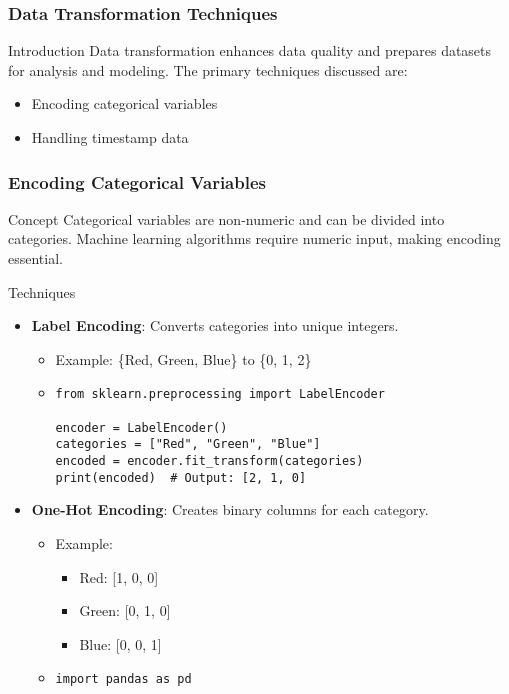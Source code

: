 \documentclass[aspectratio=169]{beamer}
\begin{document}
\begin{frame}
    \frametitle{Data Transformation Techniques}
    \begin{block}{Introduction}
        Data transformation enhances data quality and prepares datasets for analysis and modeling.
        The primary techniques discussed are:
        \begin{itemize}
            \item Encoding categorical variables
            \item Handling timestamp data
        \end{itemize}
    \end{block}
\end{frame}

\begin{frame}[fragile]
    \frametitle{Encoding Categorical Variables}
    \begin{block}{Concept}
        Categorical variables are non-numeric and can be divided into categories. 
        Machine learning algorithms require numeric input, making encoding essential.
    \end{block}
    
    \begin{block}{Techniques}
        \begin{itemize}
            \item \textbf{Label Encoding}: Converts categories into unique integers.
            \begin{itemize}
                \item Example: \{Red, Green, Blue\} to \{0, 1, 2\}
                \item \begin{lstlisting}
from sklearn.preprocessing import LabelEncoder

encoder = LabelEncoder()
categories = ["Red", "Green", "Blue"]
encoded = encoder.fit_transform(categories)
print(encoded)  # Output: [2, 1, 0]
                \end{lstlisting}
            \end{itemize}

            \item \textbf{One-Hot Encoding}: Creates binary columns for each category.
            \begin{itemize}
                \item Example: 
                \begin{itemize}
                    \item Red: [1, 0, 0]
                    \item Green: [0, 1, 0]
                    \item Blue: [0, 0, 1]
                \end{itemize}
                \item \begin{lstlisting}
import pandas as pd


\end{lstlisting}
\end{itemize}
\end{itemize}
\end{block}
\end{frame}
\end{document}
